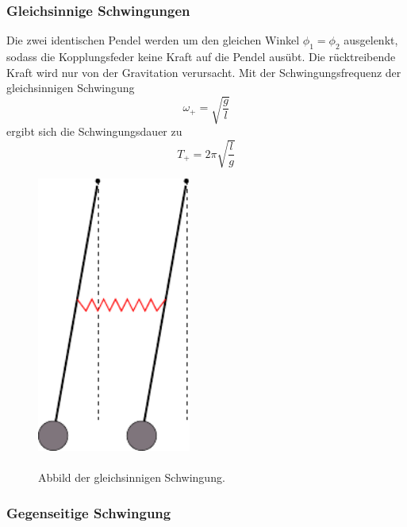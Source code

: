 \subsubsection{Gleichsinnige Schwingungen}
\label{sub:Gleich}
\begin{minipage}[t]{0.5\textwidth}
Die zwei identischen Pendel werden um den gleichen Winkel $\phi_1 = \phi_2$ ausgelenkt, sodass die Kopplungsfeder keine Kraft auf die Pendel ausübt.
Die rücktreibende Kraft wird nur von der Gravitation verursacht.
Mit der Schwingungsfrequenz der gleichsinnigen Schwingung
\begin{equation}
    \omega_+ = \sqrt{\frac{g}{l}}
    \label{eqn:omega+}
\end{equation}
ergibt sich die Schwingungsdauer zu
\begin{equation}
    T_+ = 2 \pi \sqrt{\frac{l}{g}}
    \label{eqn:T+}
\end{equation}
\end{minipage}
\begin{minipage}[t]{0.5\textwidth}
    \begin{figure}[H]
        \centering
        \includegraphics[width=0.45\textwidth]{build/Abb_1.pdf}
\caption{\\Abbild der gleichsinnigen Schwingung. \cite{V106}}
        \label{fig:gleich}
      \end{figure}
\end{minipage}
\subsubsection{Gegenseitige Schwingung}

